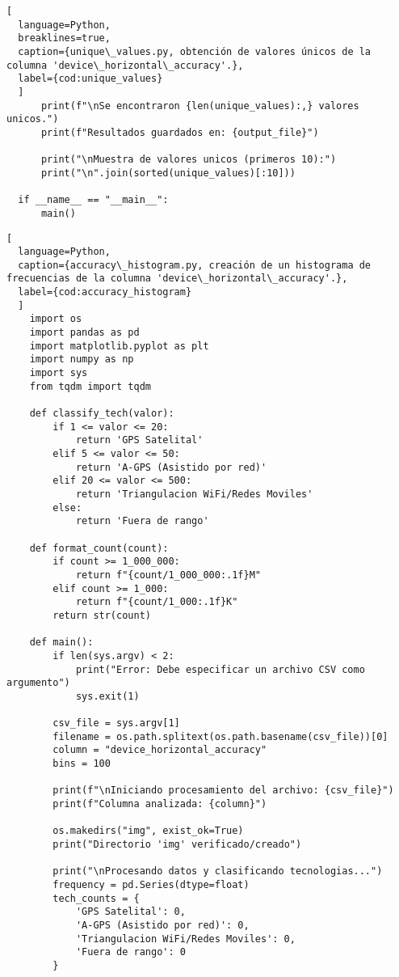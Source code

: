 \begin{lstlisting}[
  language=Python,
  breaklines=true,
  caption={unique\_values.py, obtención de valores únicos de la columna 'device\_horizontal\_accuracy'.},
  label={cod:unique_values}
  ]
      print(f"\nSe encontraron {len(unique_values):,} valores unicos.")
      print(f"Resultados guardados en: {output_file}")

      print("\nMuestra de valores unicos (primeros 10):")
      print("\n".join(sorted(unique_values)[:10]))

  if __name__ == "__main__":
      main()
\end{lstlisting}
\vfill

\begin{lstlisting}[
  language=Python,
  caption={accuracy\_histogram.py, creación de un histograma de frecuencias de la columna 'device\_horizontal\_accuracy'.},
  label={cod:accuracy_histogram}
  ]
    import os
    import pandas as pd
    import matplotlib.pyplot as plt
    import numpy as np
    import sys
    from tqdm import tqdm

    def classify_tech(valor):
        if 1 <= valor <= 20:
            return 'GPS Satelital'
        elif 5 <= valor <= 50:
            return 'A-GPS (Asistido por red)'
        elif 20 <= valor <= 500:
            return 'Triangulacion WiFi/Redes Moviles'
        else:
            return 'Fuera de rango'

    def format_count(count):
        if count >= 1_000_000:
            return f"{count/1_000_000:.1f}M"
        elif count >= 1_000:
            return f"{count/1_000:.1f}K"
        return str(count)

    def main():
        if len(sys.argv) < 2:
            print("Error: Debe especificar un archivo CSV como argumento")
            sys.exit(1)

        csv_file = sys.argv[1]
        filename = os.path.splitext(os.path.basename(csv_file))[0]
        column = "device_horizontal_accuracy"  
        bins = 100
        
        print(f"\nIniciando procesamiento del archivo: {csv_file}")
        print(f"Columna analizada: {column}")
        
        os.makedirs("img", exist_ok=True)
        print("Directorio 'img' verificado/creado")

        print("\nProcesando datos y clasificando tecnologias...")
        frequency = pd.Series(dtype=float)
        tech_counts = {
            'GPS Satelital': 0,
            'A-GPS (Asistido por red)': 0,
            'Triangulacion WiFi/Redes Moviles': 0,
            'Fuera de rango': 0
        }


\end{lstlisting}
